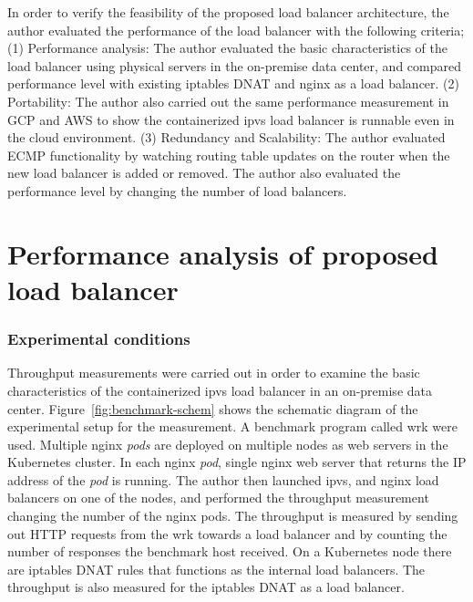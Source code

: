 
In order to verify the feasibility of the proposed load balancer architecture, the author evaluated the performance of the load balancer with the following criteria;
(1) Performance analysis:
The author evaluated the basic characteristics of the load balancer using physical servers in the on-premise data center, and compared performance level with existing iptables DNAT and nginx as a load balancer.
(2) Portability:
The author also carried out the same performance measurement in GCP and AWS to show the containerized ipvs load balancer is runnable even in the cloud environment.
(3) Redundancy and Scalability:
The author evaluated ECMP functionality by watching routing table updates on the router when the new load balancer is added or removed.
The author also evaluated the performance level by changing the number of load balancers.

\section{Performance analysis of proposed load balancer}

\subsubsection{Experimental conditions}

Throughput measurements were carried out in order to examine the basic characteristics of the containerized ipvs load balancer in an on-premise data center.
Figure~\ref{fig:benchmark-schem} shows the schematic diagram of the experimental setup for the measurement.
A benchmark program called wrk\cite{Glozer2016} were used.
Multiple nginx {\em pods} are deployed on multiple nodes as web servers in the Kubernetes cluster.
In each nginx {\em pod}, single nginx web server that returns the IP address of the {\em pod} is running.
The author then launched ipvs, and nginx load balancers on one of the nodes, and performed the throughput measurement changing the number of the nginx pods.
The throughput is measured by sending out HTTP requests from the wrk towards a load balancer and by counting the number of responses the benchmark host received.
On a Kubernetes node there are iptables DNAT rules that functions as the internal load balancers.
The throughput is also measured for the iptables DNAT as a load balancer.


